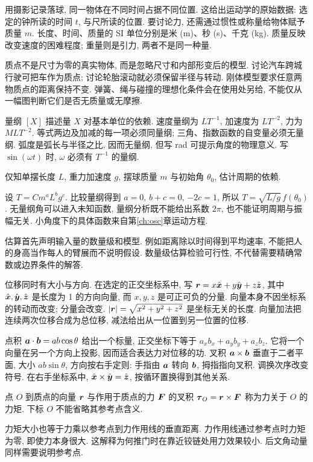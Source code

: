 \label{ch:units}
用摄影记录落球, 同一物体在不同时间占据不同位置. 这给出运动学的原始数据: 选定的钟所读的时间 $t$, 与尺所读的位置. 要讨论力, 还需通过惯性或称量给物体赋予质量 $m$. 长度、时间、质量的 SI 单位分别是米 (m)、秒 (s)、千克 (kg). 质量反映改变速度的困难程度; 重量则是引力, 两者不是同一种量.

质点不是尺寸为零的真实物体, 而是忽略尺寸和内部形变后的模型. 讨论汽车跨城行驶可把车作为质点; 讨论轮胎滚动就必须保留半径与转动. 刚体模型要求任意两物质点的距离保持不变. 弹簧、绳与碰撞的理想化条件会在使用处另给, 不能仅从一幅图判断它们是否无质量或无摩擦.

量纲 $[X]$ 描述量 $X$ 对基本单位的依赖. 速度量纲为 $LT^{-1}$, 加速度为 $LT^{-2}$, 力为 $MLT^{-2}$. 等式两边及加减的每一项必须同量纲; 三角、指数函数的自变量必须无量纲. 弧度是弧长与半径之比, 因而无量纲, 但写 rad 可提示角度的物理意义. 写 $\sin(\omega t)$ 时, $\omega$ 必须有 $T^{-1}$ 的量纲.

\begin{example}
仅知单摆长度 $L$, 重力加速度 $g$, 摆球质量 $m$ 与初始角 $\theta_0$, 估计周期的依赖.
\end{example}
\begin{solution}
设 $T=Cm^aL^bg^c$. 比较量纲得到 $a=0$, $b+c=0$, $-2c=1$, 所以 $T=\sqrt{L/g}\,f(\theta_0)$. 无量纲角可以进入未知函数, 量纲分析既不能给出系数 $2\pi$, 也不能证明周期与振幅无关. 小角度下的具体函数来自第\ref{ch:osc}章运动方程.
\end{solution}
估算首先声明输入量的数量级和模型. 例如距离除以时间得到平均速率, 不能把人的身高当作每人的臂展而不说明假设. 数量级估算检验可行性, 不代替需要精确常数或边界条件的解答.

位移同时有大小与方向. 在选定的正交坐标系中, 写 $\boldsymbol{r}=x\hat{\boldsymbol{x}}+y\hat{\boldsymbol{y}}+z\hat{\boldsymbol{z}}$, 其中 $\hat{\boldsymbol{x}},\hat{\boldsymbol{y}},\hat{\boldsymbol{z}}$ 是长度为 1 的方向向量, 而 $x,y,z$ 是可正可负的分量. 向量本身不因坐标系的转动而改变; 分量会改变. $|\boldsymbol{r}|=\sqrt{x^2+y^2+z^2}$ 是坐标无关的长度. 向量加法把连续两次位移合成为总位移, 减法给出从一位置到另一位置的位移.

点积 $\boldsymbol{a}\cdot\boldsymbol{b}=ab\cos\theta$ 给出一个标量, 正交坐标下等于 $a_xb_x+a_yb_y+a_zb_z$. 它将一个向量在另一个方向上投影, 因而适合表达力对位移的功. 叉积 $\boldsymbol{a}\times\boldsymbol{b}$ 垂直于二者平面, 大小 $ab\sin\theta$, 方向按右手定则: 手指由 $\boldsymbol{a}$ 转向 $\boldsymbol{b}$, 拇指指向叉积. 调换次序改变符号. 在右手坐标系中, $\hat{\boldsymbol{x}}\times\hat{\boldsymbol{y}}=\hat{\boldsymbol{z}}$, 按循环置换得到其他关系.

\begin{definition}
点 $O$ 到质点的向量 $\boldsymbol{r}$ 与作用于质点的力 $\boldsymbol{F}$ 的叉积 $\boldsymbol{\tau}_O=\boldsymbol{r}\times\boldsymbol{F}$ 称为力关于 $O$ 的力矩. 下标 $O$ 不能省略其参考点含义.
\end{definition}
力矩大小也等于力乘以参考点到力作用线的垂直距离. 力作用线通过参考点时力矩为零, 即使力本身很大. 这解释为何推门时在靠近铰链处用力效果较小. 后文角动量同样需要说明参考点.

